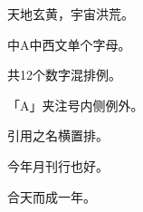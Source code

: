 \documentclass{ltc-cn-vbook}
\begin{document}
\begin{正文}
天地玄黄，宇宙洪荒。

中A中西文单个字母。

共12个数字混排例。

「A」夹注号内侧例外。

引用之名横置排。

今年月刊行也好。

合天而成一年。
\end{正文}
\end{document}
